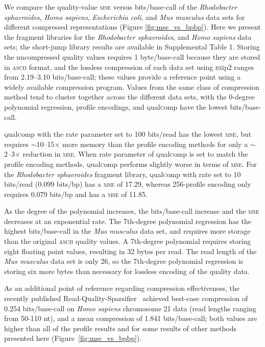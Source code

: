 \documentclass{bioinfo}
\begin{document}
We compare the quality-value \textsc{mse} versus bits/base-call of the
\textit{Rhodobacter sphaeroides}, \textit{Homo sapiens},
\textit{Escherichia coli}, and \textit{Mus musculus} data sets for
different compressed representations (Figure
\ref{fig:mse_vs_bpbp}). Here we present the fragment libraries for the
\textit{Rhodobacter sphaeroides}, and \textit{Homo sapiens} data sets;
the short-jump library results are available in Supplemental Table
1. Storing the uncompressed quality values requires 1 byte/base-call
because they are stored in \textsc{ascii} format, and the lossless
compression of each data set using \textsc{bz}ip2 ranges from
2.19--3.10 bits/base-call; these values provide a reference point
using a widely available compression program. Values from the same
class of compression method tend to cluster together across the
different data sets, with the 0-degree polynomial regression, profile
encodings, and \textsc{q}ual\textsc{c}omp have the lowest
bits/base-call.

\textsc{q}ual\textsc{c}omp with the rate parameter set to 100
bits/read has the lowest \textsc{mse}, but requires
$\sim$10--15$\times$ more memory than the profile encoding methods for
only a $\sim$2--3$\times$ reduction in \textsc{mse}. When rate
parameter of \textsc{q}ual\textsc{c}omp is set to match the profile
encoding methods, \textsc{q}ual\textsc{c}omp performs slightly worse
in terms of \textsc{mse}. For the \textit{Rhodobacter sphaeroides}
fragment library, \textsc{q}ual\textsc{c}omp with rate set to 10
bits/read (0.099 bits/bp) has a \textsc{mse} of 17.29, whereas
256-profile encoding only requires 0.079 bits/bp and has a
\textsc{mse} of 11.85.

As the degree of the polynomial increases, the bits/base-call increase
and the \textsc{mse} decreases at an exponential rate. The 7th-degree
polynomial regression has the highest bits/base-call in the
\textit{Mus musculus} data set, and requires more storage than the
original \textsc{ascii} quality values. A 7th-degree polynomial
requires storing eight floating point values, resulting in 32 bytes
per read. The read length of the \textit{Mus musculus} data set is
only 26, so the 7th-degree polynomial regression is storing six more
bytes than necessary for lossless encoding of the quality data.

As an additional point of reference regarding compression
effectiveness, the recently published
Read-Quality-Sparsifier~\citep{DBLP:conf/recomb/YuYB14} achieved
best-case compression of 0.254 bits/base-call on \textit{Homo sapiens}
chromosome 21 data (read lengths ranging from 50-110 nt), and a mean
compression of 1.841 bits/base-call; both values are higher than all
of the profile results and for some results of other methods presented
here (Figure~\ref{fig:mse_vs_bpbp}).
\end{document}
